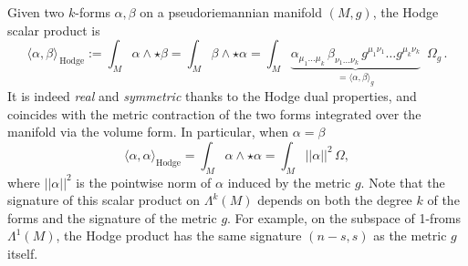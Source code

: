 \documentclass[../geometry_main.tex]{subfiles}
\begin{document}
\begin{mytheorem}
Given two \(k\)-forms \(\alpha, \beta\) on a pseudoriemannian manifold \((M,g)\), the Hodge scalar product is
\begin{equation}
    \langle \alpha, \beta \rangle_{\,\mathrm{Hodge}} := \int_M \alpha \wedge \star \beta
    = \int_M \beta \wedge \star \alpha 
    = \int_M \underbrace{\alpha_{\mu_1 \dots \mu_k}\, \beta_{\nu_1 \dots \nu_k} \,g^{\mu_1\nu_1} \dots g^{\mu_k \nu_k}}_{=\langle \alpha, \beta \rangle_g} \,\,\, \Omega_g\,.
\end{equation}
It is indeed \emph{real} and \emph{symmetric} thanks to the Hodge dual properties, and coincides with the metric contraction of the two forms integrated over the manifold via the volume form.
In particular, when \(\alpha = \beta\)
\begin{equation}
    \langle \alpha, \alpha \rangle_{\mathrm{Hodge}} = \int_M \alpha \wedge \star \alpha = \int_M ||\alpha||^2 \,\Omega,
\end{equation}
where \(||\alpha||^2\) is the pointwise norm of \(\alpha\) induced by the metric \(g\).
Note that the signature of this scalar product on $\Lambda^k(M)$ depends on both the degree \(k\) of the forms and the signature of the metric \(g\).
For example, on the subspace of 1-froms $\Lambda^1 (M)$, the Hodge product has the same signature $(n-s,s)$ as the metric \(g\) itself.
\end{mytheorem}
\end{document}
